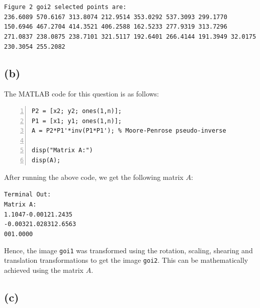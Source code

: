 \documentclass{article}
\begin{document}
\texttt{Figure 2 goi2 selected points are:\\
   236.6089  570.6167  313.8074  212.9514  353.0292  537.3093  299.1770  150.6946  467.2704  414.3521  406.2588  162.5233  277.9319  313.7296  271.0837  238.0875  238.7101  321.5117  192.6401  266.4144  191.3949   32.0175  230.3054  255.2082
}

\subsection*{(b)}

The MATLAB code for this question is as follows:
\begin{lstlisting}[frame=single,numbers=left,style=Matlab-Pyglike,breaklines=true,postbreak=\mbox{\textcolor{red}{$\hookrightarrow$}\space}]
P2 = [x2; y2; ones(1,n)];
P1 = [x1; y1; ones(1,n)];
A = P2*P1'*inv(P1*P1'); % Moore-Penrose pseudo-inverse

disp("Matrix A:")
disp(A);
\end{lstlisting}

After running the above code, we get the following matrix $A$:

\texttt{Terminal Out:\\
Matrix A:\\
\hspace*{2em}1.1047\hspace*{1.5em}-0.0012\hspace*{2.5em}1.2435\\
\hspace*{1.5em}-0.0032\hspace*{2em}1.0283\hspace*{2em}12.6563\\
\hspace*{2em}\hspace*{2.5em}0\hspace*{2em}\hspace*{2.5em}0\hspace*{2em}\hspace*{0.5em}1.0000}

Hence, the image \texttt{goi1} was transformed using the rotation, scaling, shearing and translation transformations to get the image \texttt{goi2}. This can be mathematically achieved using the matrix $A$.

\subsection*{(c)}
\end{document}
